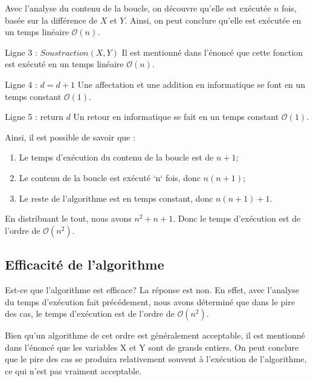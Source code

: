 \documentclass[12pt]{article}
\begin{document}
  	Avec l'analyse du contenu de la boucle, on découvre qu'elle est exécutée
  	\( n \) fois, basée sur la différence de \( X \) et \( Y \). Ainsi, on peut
    conclure qu'elle est exécutée en un temps linéaire \( \mathcal{O}(n) \).
    \newline

    Ligne 3 : \( Soustraction(X, Y) \) \newline
    Il est mentionné dans l'énoncé que cette fonction est exécuté en un temps
	  linéaire \( \mathcal{O}(n) \). \newline

    Ligne 4 : \( d = d + 1 \) \newline
    Une affectation et une addition en informatique se font en un temps constant
    \( \mathcal{O}(1) \). \newline

    Ligne 5 : return \( d \) \newline
  	Un retour en informatique se fait en un temps constant
    \( \mathcal{O}(1) \). \newline

    \noindent Ainsi, il est possible de savoir que :
    \begin{enumerate}
      \item Le temps d'exécution du contenu de la boucle est de \( n + 1 \);
      \item Le contenu de la boucle est exécuté `n` fois, donc \( n(n + 1) \);
      \item Le reste de l'algorithme est en temps constant, donc
       \( n(n + 1) + 1 \).
    \end{enumerate}

    \noindent En distribuant le tout, nous avons \( n ^ 2 + n + 1 \). Donc le
    temps d'exécution est de l'ordre de \( \mathcal{O}(n^2) \).

  \subsection*{Efficacité de l'algorithme}
   	Est-ce que l'algorithme est efficace? La réponse est non. En effet, avec
   	l'analyse du temps d'exécution fait précédement, nous avons déterminé
   	que dans le pire des cas, le temps d'exécution est de l'ordre
   	de \( \mathcal{O}(n^2) \). \newline

   	\noindent Bien qu'un algorithme de cet ordre est généralement acceptable,
   	il est mentionné dans l'énoncé que les variables X et Y sont de grands
   	entiers. On peut conclure que le pire des cas se produira relativement
   	souvent à l'exécution de l'algorithme, ce qui n'est pas vraiment
    acceptable. \newline
\end{document}
